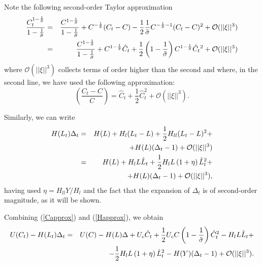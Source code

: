 \documentclass[11pt,aspectratio=169]{beamer}
\begin{document}
\begin{frame}\small
Note the following second-order Taylor approximation%
\begin{eqnarray}
\frac{C_{t}^{1-\frac{1}{\tilde{\sigma}}}}{1-\frac{1}{\tilde{\sigma}}} &=&%
\frac{C^{1-\frac{1}{\tilde{\sigma}}}}{1-\frac{1}{\tilde{\sigma}}}+C^{-\frac{1%
}{\tilde{\sigma}}}(C_{t}-C)-\frac{1}{2}\frac{1}{\tilde{\sigma}}C^{-\frac{1}{%
\tilde{\sigma}}-1}(C_{t}-C)^{2}+\mathcal{O}(||\xi ||^{3})  \notag \\
&=&\frac{C^{1-\frac{1}{\tilde{\sigma}}}}{1-\frac{1}{\tilde{\sigma}}}+C^{1-%
\frac{1}{\tilde{\sigma}}}\hat{C}_{t}+\frac{1}{2}\left( 1-\frac{1}{\tilde{%
\sigma}}\right) C^{1-\frac{1}{\tilde{\sigma}}}\hat{C}_{t}{}^{2}+\mathcal{O}%
(||\xi ||^{3})  \label{Capprox}
\end{eqnarray}%
where $\mathcal{O}(||\xi ||^{3})$ collects terms of order higher than the
second and where, in the second line, we have used the following
approximation:%
\begin{equation*}
\left( \frac{C_{t}-C}{C}\right) =\hat{C}_{t}+\frac{1}{2}\hat{C}_{t}^{2}+%
\mathcal{O}(||\xi ||^{3}).
\end{equation*}%
\end{frame}
\begin{frame}\small
Similarly, we can write%
\begin{eqnarray}
H(L_{t})\Delta _{t} &=&H(L)+H_{l}(L_{t}-L)+\frac{1}{2}H_{ll}(L_{t}-L)^{2}+ 
\notag \\
&&+H(L)(\Delta _{t}-1)+\mathcal{O}(||\xi ||^{3})  \notag \\
&=&H(L)+H_{l}L\hat{L}_{t}+\frac{1}{2}H_{l}L\left( 1+\eta \right) \hat{L}%
_{t}^{2}+  \notag \\
&&+H(L)(\Delta _{t}-1)+\mathcal{O}(||\xi ||^{3}),  \label{Happrox}
\end{eqnarray}%
having used $\eta =H_{ll}Y/H_{l}$ and the fact that the expansion of $\Delta
_{t}$ is of second-order magnitude, as it will be shown.

Combining (\ref{Capprox}) and (\ref{Happrox}), we obtain%
\begin{eqnarray}
U(C_{t})-H(L_{t})\Delta _{t} &=&U(C)-H(L)\Delta +U_{c}\hat{C}_{t}+\frac{1}{2}%
U_{c}C\left( 1-\frac{1}{\tilde{\sigma}}\right) \hat{C}_{t}^{2}-H_{l}L\hat{L}%
_{t}+  \notag \\
&&-\frac{1}{2}H_{l}L\left( 1+\eta \right) \hat{L}_{t}^{2}-H(Y)(\Delta
_{t}-1)+\mathcal{O}(||\xi ||^{3}).  \label{Uapprox2}
\end{eqnarray}%
\end{frame}
\end{document}
